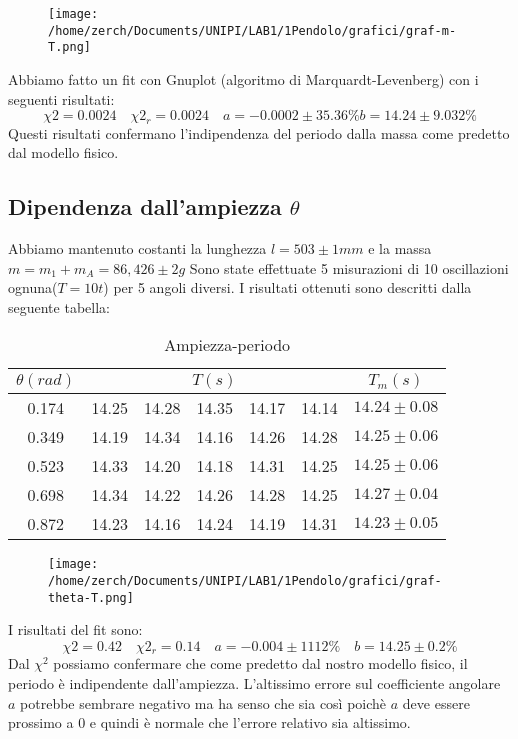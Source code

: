 \documentclass[a4paper,10pt]{article}
\begin{document}
\begin {figure}[!htb]
\begin{center}
\texttt{[image: /home/zerch/Documents/UNIPI/LAB1/1Pendolo/grafici/graf-m-T.png]}
\end{center}
\end {figure}
Abbiamo fatto un fit con Gnuplot (algoritmo di Marquardt-Levenberg) con i seguenti risultati:
\begin{equation}
\chi2=0.0024 \quad \chi2_r=0.0024 \quad a=-0.0002\pm35.36\% b=14.24\pm9.032\%
\end{equation}
Questi risultati confermano l'indipendenza del periodo dalla massa come predetto dal modello fisico.

\subsection{Dipendenza dall'ampiezza $\theta$}
Abbiamo mantenuto costanti la lunghezza $l=503\pm1mm$ e la massa $m=m_1+m_A=86,426\pm2 g$
Sono state effettuate 5 misurazioni di 10 oscillazioni ognuna($T=10t$) per 5 angoli diversi.
I risultati ottenuti sono descritti dalla seguente tabella:
\begin{table}[!htb]
\centering
\caption{Ampiezza-periodo}
\label{my-label}
\begin{tabular}{c|ccccc|c}
$\theta(rad)$ & \multicolumn{5}{c|}{$T(s)$}           & $T_m(s)$       \\ \hline
0.174         & 14.25 & 14.28 & 14.35 & 14.17 & 14.14 & $14.24\pm0.08$ \\
0.349         & 14.19 & 14.34 & 14.16 & 14.26 & 14.28 & $14.25\pm0.06$ \\
0.523         & 14.33 & 14.20 & 14.18 & 14.31 & 14.25 & $14.25\pm0.06$ \\
0.698         & 14.34 & 14.22 & 14.26 & 14.28 & 14.25 & $14.27\pm0.04$ \\
0.872         & 14.23 & 14.16 & 14.24 & 14.19 & 14.31 & $14.23\pm0.05$
\end{tabular}
\end{table}

\begin {figure}[!htb]
\begin{center}
\texttt{[image: /home/zerch/Documents/UNIPI/LAB1/1Pendolo/grafici/graf-theta-T.png]}
\end{center}
\end {figure}

I risultati del fit sono:
\begin{equation}
\chi2=0.42 \quad \chi2_r=0.14 \quad a=-0.004\pm1112\% \quad b=14.25\pm0.2\%
\end{equation}
Dal $\chi^2$ possiamo confermare che come predetto dal nostro modello fisico, il periodo è indipendente dall'ampiezza. L'altissimo errore sul coefficiente angolare $a$ potrebbe sembrare negativo ma ha senso che sia così poichè $a$ deve essere prossimo a 0 e quindi è normale che l'errore relativo sia altissimo.
\end{document}
